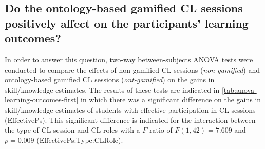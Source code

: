 \newpage
\subsection*{Do the ontology-based gamified CL sessions positively affect on the participants' learning outcomes?}

In order to answer this question, two-way between-subjects ANOVA tests were conducted to compare the effects of non-gamified CL sessions (\emph{non-gamified}) and ontology-based gamified CL sessions (\emph{ont-gamified}) on the gains in skill/knowledge estimates. The results of these tests are indicated in \autoref{tab:anova-learning-outcomes-first} in which there was a significant difference on the gains in skill/knowledge estimates of students with effective participation in CL sessions (EffectivePs). This significant difference is indicated for the interaction between the type of CL session and CL roles with a $F$ ratio of $F(1,42) = 7.609$ and $p = 0.009$ (EffectivePs:Type:CLRole).


